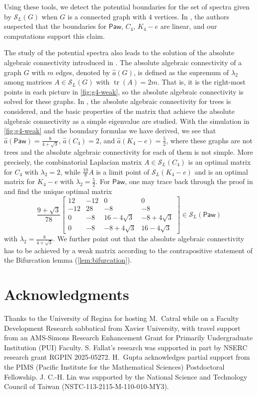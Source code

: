 \documentclass{article}
\theoremstyle{definition}
\newcommand{\tr}{\operatorname{tr}}
\newcommand{\mptn}{\mathcal{S}}
\newcommand{\Paw}{\mathsf{Paw}}
\begin{document}
Using these tools, we detect the potential boundaries for the set of spectra given by $\mptn_L(G)$ when $G$ is a connected graph with $4$ vertices.  In \cite{IEPL}, the authors suspected that the boundaries for $\Paw$, $C_4$, $K_4 - e$ are linear, and our computations support this claim.

The study of the potential spectra also leads to the solution of the absolute algebraic connectivity introduced in \cite{Fiedler90}.  The absolute algebraic connectivity of a graph $G$ with $m$ edges, denoted by $\hat{a}(G)$, is defined as the supremum of $\lambda_2$ among matrices $A\in\mptn_L(G)$ with $\tr(A) = 2m$.  That is, it is the right-most points in each picture in \cref{fig:g4-weak}, so the absolute algebraic connectivity is solved for these graphs.  In \cite{Fiedler90}, the absolute algebraic connectivity for trees is considered, and the basic properties of the matrix that achieve the absolute algebraic connectivity as a simple eigenvalue are studied.  With the simulation in \cref{fig:g4-weak} and the boundary formulas we have derived, we see that $\hat{a}(\Paw) = \frac{8}{4 + \sqrt{3}}$, $\hat{a}(C_4) = 2$, and $\hat{a}(K_4 - e) = \frac{5}{2}$, where these graphs are not trees and the absolute algebraic connectivity for each of them is not simple.  More precisely, the combinatorial Laplacian matrix $A\in\mptn_L(C_4)$ is an optimal matrix for $C_4$ with $\lambda_2 = 2$, while $\frac{10}{8}A$ is a limit point of $\mptn_L(K_4 - e)$ and is an optimal matrix for $K_4 - e$ with $\lambda_2 = \frac{5}{2}$.  For $\Paw$, one may trace back through the proof in \cite[Theorem~3.13]{IEPL} and find the unique optimal matrix
\[
    \frac{9 + \sqrt{3}}{78}
    \begin{bmatrix}
        12 & -12 & 0 & 0 \\
        -12 & 28 & -8 & -8 \\
        0 & -8 & 16 -4\sqrt{3} & -8 + 4\sqrt{3} \\
        0 & -8 & -8 + 4\sqrt{3} & 16 -4\sqrt{3}
    \end{bmatrix}
    \in \mptn_L(\Paw)
\]
with $\lambda_2 = \frac{8}{4 + \sqrt{3}}$.  We further point out that the absolute algebraic connectivity has to be achieved by a weak matrix according to the contrapositive statement of the Bifurcation lemma (\cref{lem:bifurcation}).

\section{Acknowledgments}
Thanks to the University of Regina for hosting M.~Catral while on a Faculty Development Research sabbatical from Xavier University, with travel  support from  an AMS-Simons Research Enhancement Grant for Primarily Undergraduate Institution (PUI) Faculty.
S. Fallat's research was supported in part by NSERC research grant RGPIN 2025-05272. H.~Gupta acknowledges partial support from the PIMS (Pacific Institute for the Mathematical Sciences) Postdoctoral Fellowship.
J. C.-H. Lin was supported by the National Science and Technology Council of Taiwan (NSTC-113-2115-M-110-010-MY3). 
\end{document}
